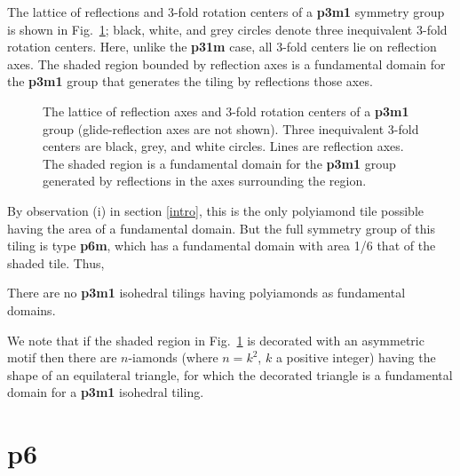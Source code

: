 \documentclass{ws-ijcga}
\begin{document}
The lattice of reflections and 3-fold rotation centers of a {\bf p3m1} symmetry group is shown 
in Fig.~\ref{fig:p3m1}; 
black, white, and grey circles denote three inequivalent 3-fold rotation centers. 
Here, unlike the {\bf p31m} case, 
all 3-fold centers lie on reflection axes. 
The shaded region bounded by reflection axes is a fundamental domain for the {\bf p3m1} group 
that generates the tiling by reflections those axes. 
\begin{figure}[h]
\centerline{
}
\vspace*{8pt}
\caption{
The lattice of reflection axes and 3-fold rotation centers of a {\bf p3m1} group 
(glide-reflection axes are not shown). 
Three inequivalent 3-fold centers are black, grey, and white circles. 
Lines are reflection axes. 
The shaded region is a fundamental domain for the {\bf p3m1} group generated by reflections 
in the axes surrounding the region.
\label{fig:p3m1}
    }
\end{figure}
By observation (i) in section \ref{intro}, 
this is the only polyiamond tile possible having the area of a fundamental domain. 
But the full symmetry group of this tiling is type {\bf p6m}, 
which has a fundamental domain with area 1/6 that of the shaded tile. Thus,

\begin{theorem}
There are no {\bf p3m1} isohedral tilings having polyiamonds as fundamental domains.
\end{theorem}

We note that if the shaded region in Fig.~\ref{fig:p3m1} is decorated with an asymmetric motif 
then there are $n$-iamonds (where $n = k^2$, $k$ a positive integer) having the shape of an equilateral triangle, 
for which the decorated triangle is a fundamental domain for a {\bf p3m1} isohedral tiling.












\section{{\bf p6}}
\label{p6}
\end{document}

